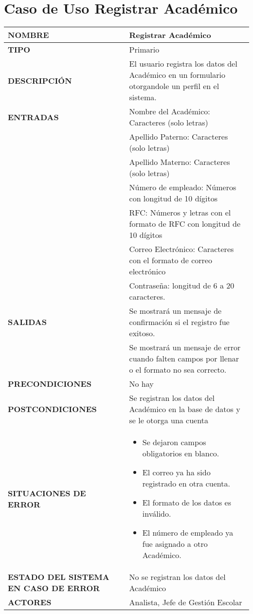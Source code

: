 \newpage
\section{Caso de Uso Registrar Académico}
\begin{longtable}{ | p{6cm} | p{10cm} |}
\hline
\textbf{NOMBRE} & Registrar Académico\\
\hline
\textbf{TIPO} & Primario\\
\hline
\textbf{DESCRIPCIÓN} & El usuario registra los datos del Académico en un formulario otorgandole un perfil en el sistema.\\
\hline
\textbf{ENTRADAS} & Nombre del Académico: Caracteres (solo letras)\\& Apellido Paterno: Caracteres (solo letras)\\& Apellido Materno: Caracteres (solo letras)\\&Número de empleado: Números con longitud de 10 dígitos\\&RFC: Números y letras con el formato de RFC con longitud de 10 dígitos\\& Correo Electrónico: Caracteres con el formato de correo electrónico\\& Contraseña: longitud de 6 a 20 caracteres.\\
\hline
\textbf{SALIDAS} & Se mostrará un mensaje de confirmación si el registro fue exitoso.\\& Se mostrará un mensaje de error cuando falten campos por llenar o el formato no sea correcto.\\
\hline
\textbf{PRECONDICIONES} & No hay\\
\hline
\textbf{POSTCONDICIONES} & Se registran los datos del Académico en la base de datos y se le otorga una cuenta\\
\hline
\textbf{SITUACIONES DE ERROR} & \begin{itemize}
    \item Se dejaron campos obligatorios en blanco.
    \item El correo ya ha sido registrado en otra cuenta.
    \item El formato de los datos es inválido.
    \item El número de empleado ya fue asignado a otro Académico.
\end{itemize}\\
\hline
\textbf{ESTADO DEL SISTEMA EN CASO DE ERROR} & No se registran los datos del Académico\\
\hline
\textbf{ACTORES} & Analista, Jefe de Gestión Escolar\\
\hline
\end{longtable}
